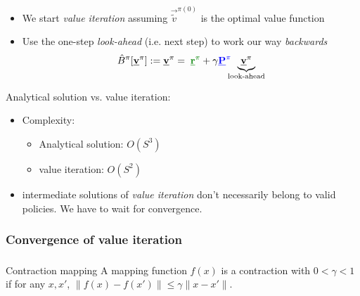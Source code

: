 \begin{frame}\frametitle{\subsubsecname}
    

\begin{itemize}
\item We start \emph{value iteration} assuming $\vec {\tilde v}^{\pi (0)}$ is the optimal value function
\item Use the one-step \emph{look-ahead} (i.e. next step) to work our way \emph{backwards}\\

	\begin{equation*}
		\hat B^\pi[\vec v^\pi] := \vec v^\pi
		= \; {\color{reward}\vec r^\pi} 
			+ \gamma {\color{trans}\vec P^\pi} \kern-1.2ex \underbrace{\vec v^\pi}_{\text{look-ahead}}
	\end{equation*}
\end{itemize}

Analytical solution vs. value iteration:

\begin{itemize}
\item Complexity: 
\begin{itemize}
\item Analytical solution: $O(S^{3})$
\item value iteration: $O(S^{2})$
\end{itemize}   
\item intermediate solutions of \emph{value iteration} don't necessarily belong to valid policies. We have to wait for convergence.
\end{itemize}

\end{frame}

\newpage

\subsubsection{Convergence of value iteration}


\begin{frame} \frametitle{\subsubsecname}
    
	\begin{block}{Contraction mapping}
		\small
		A mapping function $f(x)$ is a contraction with $0 < \gamma < 1$ if for any $x, x'$, $\lVert f(x) - f(x') \rVert \le \gamma \lVert x - x' \rVert$.
	\normalsize
	\end{block}
    
    
\end{frame}

